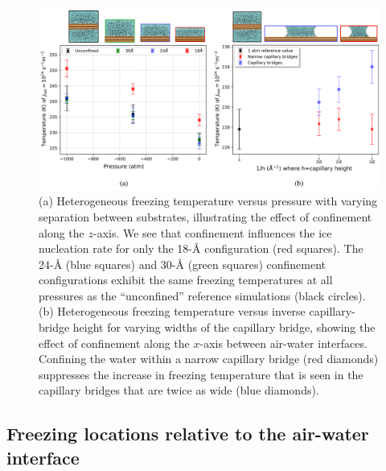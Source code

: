 \documentclass[journal abbreviation, manuscript]{copernicus}
\begin{document}
\begin{figure}[t]
\includegraphics[width=12cm]{figures/confinement_effects.png}
\caption{(a) Heterogeneous freezing temperature versus pressure with varying separation between substrates, illustrating the effect of confinement along the $z$-axis. We see that confinement influences the ice nucleation rate for only the 18-\AA{} configuration (red squares). The 24-\AA{} (blue squares) and 30-\AA{} (green squares) confinement configurations exhibit the same freezing temperatures at all pressures as the ``unconfined'' reference simulations (black circles). (b) Heterogeneous freezing temperature versus inverse capillary-bridge height for varying widths of the capillary bridge, showing the effect of confinement along the $x$-axis between air-water interfaces. Confining the water within a narrow capillary bridge (red diamonds) suppresses the increase in freezing temperature that is seen in the capillary bridges that are twice as wide (blue diamonds).}
\label{fig:confinement}
\end{figure}



\subsection{Freezing locations relative to the air-water interface} \label{ice locations}
\end{document}
